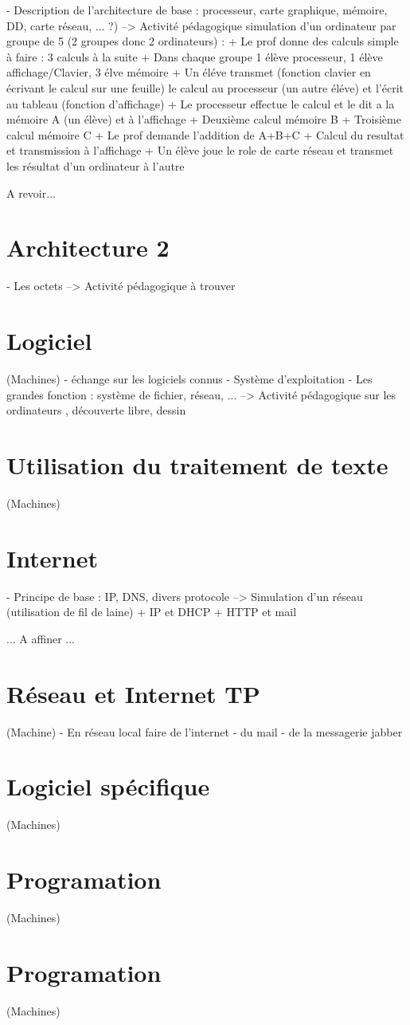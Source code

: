 \documentclass[a4paper,10pt]{report}
\begin{document}
- Description de l'architecture de base : processeur, carte graphique, mémoire, DD, carte réseau, ... ?)
--> Activité pédagogique simulation d'un ordinateur par groupe de 5 (2 groupes donc 2 ordinateurs) :
    + Le prof donne des calculs simple à faire : 3 calculs à la suite
    + Dans chaque groupe 1 élève processeur, 1 élève affichage/Clavier, 3 élve mémoire
    + Un éléve transmet (fonction clavier en écrivant le calcul sur une feuille) le calcul au processeur (un autre éléve) et l'écrit au tableau (fonction d'affichage)
    + Le processeur effectue le calcul et le dit a la mémoire A (un élève) et à l'affichage
    + Deuxième calcul mémoire B
    + Troisième calcul mémoire C
    + Le prof demande l'addition de A+B+C
    + Calcul du resultat et transmission à l'affichage
    + Un élève joue le role de carte réseau et transmet les résultat d'un ordinateur à l'autre

A revoir...

\section{Architecture 2}

- Les octets
--> Activité pédagogique à trouver

\section{Logiciel}
 
(Machines)
- échange sur les logiciels connus
- Système d'exploitation
- Les grandes fonction : système de fichier, réseau, ...
--> Activité pédagogique sur les ordinateurs , découverte libre, dessin

\section{Utilisation du traitement de texte}
 
(Machines)

\section{Internet}

- Principe de base : IP, DNS, divers protocole
--> Simulation d'un réseau (utilisation de fil de laine)
  + IP et DHCP
  + HTTP et mail 

... A affiner ...

\section{Réseau et Internet TP}
 
(Machine)
- En réseau local faire de l'internet
- du mail
- de la messagerie jabber

\section{Logiciel spécifique}
 
(Machines)

\section{Programation}
 
(Machines)

\section{Programation}
 
(Machines)
\end{document}
